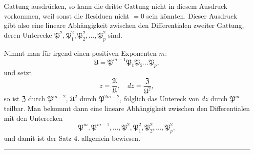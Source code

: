 Gattung ausdrücken, so kann die dritte Gattung nicht in diesem Ausdruck vorkommen, weil sonst die Residuen nicht $=0$ sein könnten. Dieser Ausdruck gibt also eine lineare Abhängigkeit zwischen den Differentialen zweiter Gattung, deren Unterecke $\mathfrak P^2, \mathfrak P_1^2, \mathfrak P_2^2, \ldots, \mathfrak P_p^2$ sind.

Nimmt man für irgend einen positiven Exponenten $m$:
\[
\mathfrak U = \mathfrak P^{m-1}\mathfrak P_1\mathfrak P_2\ldots\mathfrak P_p,
\]
und setzt
\[
z = \frac{\mathfrak A}{\mathfrak U}, \quad dz = \frac{\mathfrak Z}{\mathfrak U^2},
\]
so ist $\mathfrak Z$ durch $\mathfrak P^{m-2}$, $\mathfrak U^2$ durch $\mathfrak P^{2m-2}$, folglich das Untereck von $dz$ durch $\mathfrak P^m$ teilbar. Man bekommt dann eine lineare Abhängigkeit zwischen den Differentialen mit den Unterecken
\[
\mathfrak P^m, \mathfrak P^{m-1}, \ldots, \mathfrak P^2, \mathfrak P_1^2, \mathfrak P_2^2, \ldots, \mathfrak P_p^2,
\]
und damit ist der Satz 4. allgemein bewiesen.

\begin{center}
\rule{4cm}{0.4pt}
\end{center}
